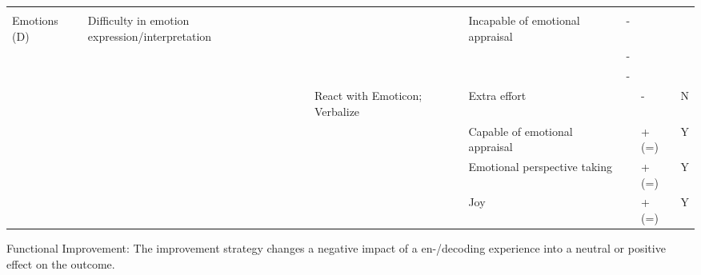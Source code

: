 \documentclass[man]{apa7}
\begin{document}
\begin{landscape}
\begin{table}
\begin{tabular}{lllllll}
                                   &                                                 &                                  &                                        &             &             &                                 \\
Emotions (D)                       & Difficulty in emotion expression/interpretation &                                  & Incapable of emotional appraisal       & -           &             &                                 \\
                                   &                                                 &                                  &                                        & -           &             &                                 \\
                                   &                                                 &                                  &                                        & -           &             &                                 \\
                                   &                                                 & React with Emoticon; Verbalize   & Extra effort                           &             & -           & N                               \\
                                   &                                                 &                                  & Capable of emotional appraisal         &             & + (=)       & Y                               \\
                                   &                                                 &                                  & Emotional perspective taking  &             & + (=)       & Y                               \\
                                   &                                                 &                                  & Joy                                    &             & + (=)       & Y                                 \\ \bottomrule
\end{tabular}
  \begin{tablenotes}
        {\tiny
            Functional Improvement: The improvement strategy changes a negative impact of a en-/decoding experience into a neutral or positive effect on the outcome.
         }
    \end{tablenotes}
\end{table}

\end{landscape}
\end{document}
